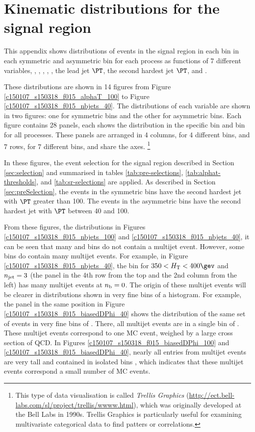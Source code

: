 \section{Kinematic distributions for the signal region}
\label{sec:kisigplot}

This appendix shows distributions of events in the signal region in
each \scalht bin in each symmetric and asymmetric \njet bin for each
process as functions of 7 different variables, \ie, \alphat, \mht,
\bdphi, \met, the lead jet $\PT$, the second hardest jet $\PT$, and
\nb.

These distributions are shown in 14 figures from Figure
\ref{c150107_s150318_f015_alphaT_100} to Figure
\ref{c150107_s150318_f015_nbjets_40}. The distributions of each variable
are shown in two figures: one for symmetric \njet bins and the other for
asymmetric \njet bins. Each figure contains 28 panels, each shows the
distribution in the specific \scalht bin and \njet bin for all
processes. These panels are arranged in 4 columns, for 4 different \njet
bins, and 7 rows, for 7 different \scalht bins, and share the axes.
\footnote{This type of data visualisation is called \textit{Trellis
Graphics} (\url{http://ect.bell-labs.com/sl/project/trellis/wwww.html}),
which was originally developed at the Bell Labs in 1990s. Trellis
Graphics is particularly useful for examining multivariate categorical
data \eg to find patters or correlations.}


In these figures, the event selection for the signal region described
in Section \ref{sec:selection} and summarised in tables
\ref{tab:pre-selections}, \ref{tab:alphat-thresholds}, and
\ref{tab:sr-selections} are applied. As described in Section
\ref{sec:preSelection}, the events in the symmetric \njet bins have
the second hardest jet with $\PT$ greater than 100\gev. The events in
the asymmetric \njet bins have the second hardest jet with $\PT$
between 40 and 100\gev.

From these figures, \eg the \nb distributions in Figures
\ref{c150107_s150318_f015_nbjets_100} and
\ref{c150107_s150318_f015_nbjets_40}, it can be seen that many \scalht
and \njet bins do not contain a multijet event. However, some bins do
contain many multijet events. For example, in Figure
\ref{c150107_s150318_f015_nbjets_40}, the bin for $350 < \scalht <
400\gev$ and $n_{\text{jet}} = 3$ (the panel in the 4th row from the top and
the 2nd column from the left) has many multijet events at $n_{\text{b}} = 0$.
The origin of these multijet events will be clearer in distributions
shown in very fine bins of a histogram. For example, the panel in the
same position in Figure \ref{c150107_s150318_f015_biasedDPhi_40} shows
the distribution of the same set of events in very fine bins of
\bdphi. There, all multijet events are in a single bin of \bdphi.
These multijet events correspond to one MC event, weighed by a large
cross section of QCD. In Figures
\ref{c150107_s150318_f015_biasedDPhi_100} and
\ref{c150107_s150318_f015_biasedDPhi_40}, nearly all entries from
multijet events are very tall and contained in isolated bins \bdphi,
which indicates that these multijet events correspond a small number
of MC events.


